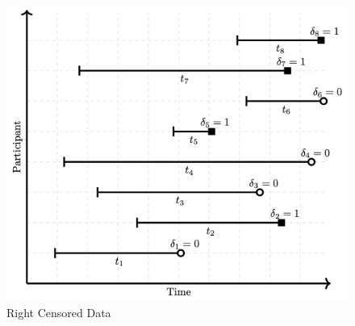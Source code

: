 \documentclass[
]{article}
\begin{document}
\begin{figure}
\centering
\includegraphics{./censoredData.png}
\caption{Right Censored Data}
\end{figure}
\end{document}
